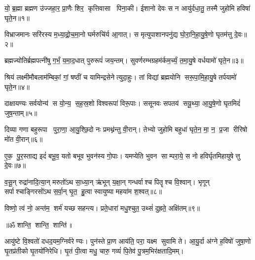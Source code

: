

यो॒ ब्र॒ह्मा ब्रह्मण उ॑ज्जहा॒र॒ प्रा॒णैः शिर॒ कृत्तिवासा पिना॒की।
ईशानो देवः स न आयु॑र्दधा॒तु॒ तस्मै जुहोमि हविषा॑ घृते॒न॥१॥

विभ्राजमानः सरि॑रस्य म॒ध्या॒द्रो॒च॒मा॒नो घर्मरुचि॑र्य आ॒गात्।
स मृत्युपाशानपनु॑द्य घो॒रा॒नि॒हा॒यु॒षे॒णो घृतम॑त्तु दे॒वः॥२॥

ब्रह्मज्योतिर्ब्रह्मपत्नी॑षु  ग॒र्भं॒ य॒मा॒द॒धात् पुरुरूपं॑ जय॒न्तम्।
सुवर्णरम्भग्रहम॑र्कम॒र्च्यं॒ त॒मा॒यु॒षे वर्धयामो॑ घृते॒न॥३॥

श्रियं लक्ष्मीमौबलाम॑म्बिकां॒ गां॒ षष्ठीं च यामिन्द्रसेनेत्युदा॒हुः।
तां विद्यां ब्रह्मयोनि सरू॒पा॒मि॒हा॒यु॒षे तर्पयामो॑ घृते॒न॥४॥

दाक्षायण्यः सर्वयोन्य॑ स यो॒न्य॒ स॒ह॒स्र॒शो विश्वरूपा॑ विरू॒पाः।
ससूनवः सपतय॑ सयू॒थ्या॒ आ॒यु॒षे॒णो घृतमिदं॑ जुष॒न्ताम्॥५॥

दिव्या गणा बहुरूपा पुरा॒णा॒ आ॒यु॒श्छि॒दो नः प्रमथ्न॑न्तु वी॒रान्।
तेभ्यो जुहोमि बहुधा॑ घृते॒न॒ मा॒ न॒ प्र॒जा रीरिषो मो॑त वी॒रान्॥६॥

ए॒क॒ पु॒र॒स्ताद्य इदं॑ बभू॒व॒ यतो बभूव भुवन॑स्य गो॒पाः।
यमप्येति भुवन साम्परा॒ये॒ स नो हविर्घृतमिहायुषेत्तु दे॒वः॥७॥

व॒सू॒न् रुद्रा॑नादि॒त्या॒न् मरुतो॑ऽथ सा॒ध्या॒न् ऋ॑भून् य॒क्षा॒न् गन्धर्वाश्च पितॄश्च वि॒श्वान्।
 भृगून् सर्पाश्चाङ्गिरसो॑ऽथ स॒र्वा॒न् घृ॒त॒ हु॒त्वा स्वायुष्या महया॑म श॒श्वत्॥८॥

विष्णो॒ त्वं नो॒ अन्त॑म॒ शर्म॑ यच्छ सहन्त्य।
प्रते॒धारा॑ मधु॒श्चुत॒ उथ्सं॑ दुह्रते॒ अक्षि॑तम्॥९॥

\centerline{॥ॐ शान्ति॒ शान्ति॒ शान्ति॑॥}
\vspace{-0.25ex}
\closesection
\vspace{-0.25ex}
आयु॑ष्टे वि॒श्वतो॑ दधद॒यम॒ग्निर्वरेण्यः। पुन॑स्ते प्रा॒ण आय॑ति॒ परा॒ यक्ष्म सुवामि ते। आ॒यु॒र्दा अ॑ग्ने ह॒विषो॑ जुषा॒णो घृ॒तप्र॑तीको घृ॒तयो॑निरेधि। घृ॒तं पी॒त्वा मधु॒ चारु॒ गव्यं॑ पि॒तेव॑ पु॒त्रम॒भिर॑क्षतादि॒मम्।